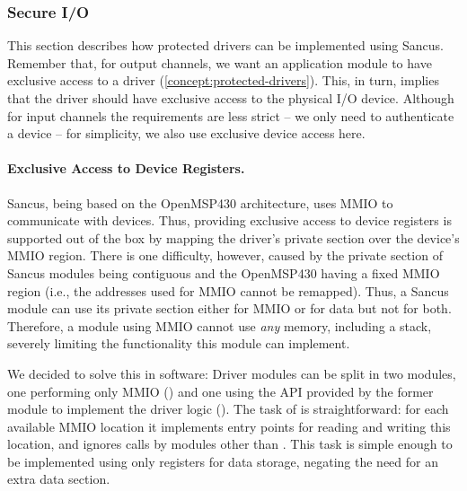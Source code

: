 \subsubsection{Secure I/O}
%
\label{concept:secure-io-sancus} This section describes how protected drivers
can be implemented using Sancus.  Remember that, for output channels, we want an
application module to have exclusive access to a driver
(\cref{concept:protected-drivers}).  This, in turn, implies that the driver
should have exclusive access to the physical I/O device.  Although for input
channels the requirements are less strict -- we only need to authenticate a
device -- for simplicity, we also use exclusive device access here.

\paragraph*{Exclusive Access to Device Registers.}
\label{concept:exclusive-device-access}
%
Sancus, being based on the OpenMSP430 architecture, uses \acf{MMIO} to
communicate with devices.  Thus, providing exclusive access to device registers
is supported out of the box by mapping the driver's private section over the
device's \ac{MMIO} region. There is one difficulty, however, caused by the
private section of Sancus modules being contiguous and the OpenMSP430 having a
fixed \ac{MMIO} region (i.e., the addresses used for \ac{MMIO} cannot be
remapped).  Thus, a Sancus module can use its private section either for
\ac{MMIO} or for data but not for both. Therefore, a module using \ac{MMIO}
cannot use \emph{any} memory, including a stack, severely limiting the
functionality this module can implement.

We decided to solve this in software:
\label{concept:driver-split}
Driver modules can be split in two modules, one performing only \ac{MMIO}
() and one using the API provided by the former module to
implement the driver logic (). The task of  is
straightforward: for each available \ac{MMIO} location it implements entry
points for reading and writing this location, and ignores calls by modules other
than . This task is simple enough to be implemented using only
registers for data storage, negating the need for an extra data section.

